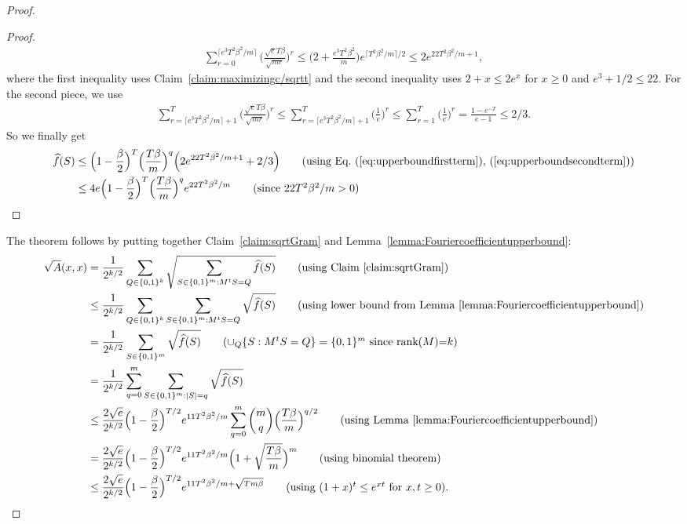 \documentclass[twoside,11pt]{article}
\def\01{\{0,1\}}
\begin{document}
\begin{proof}
\begin{proof}
		\begin{align}
		\label{eq:upperboundfirstterm}
		\sum_{r=0}^{\lceil e^3T^2\beta^2/m\rceil} \Big( \frac{\sqrt{e}T\beta}{\sqrt{mr}} \Big)^{r}\leq \Big(2+\frac{e^3T^2\beta^2}{m} \Big)e^{\lceil T^2\beta^2/m \rceil/2}\leq 2e^{22T^2\beta^2/m+1}, 
		\end{align}
		where the first inequality uses Claim~\ref{claim:maximizingc/sqrtt} and the second inequality uses $2+x\leq 2e^x$ for $x\geq 0$ and $e^3+1/2\leq 22$.
		For the second piece, we  use 
		\begin{align}
		\label{eq:upperboundsecondterm}
		\sum_{r={\lceil e^3T^2\beta^2/m\rceil+1}}^{T} \Big( \frac{\sqrt{e}T\beta}{\sqrt{mr}} \Big)^{r} \leq \sum_{r={\lceil e^3T^2\beta^2/m\rceil+1}}^{T}\Big( \frac{1}{e} \Big)^{r} \leq  \sum_{r=1}^{T} \Big( \frac{1}{e} \Big)^{r} = \frac{1-e^{-T}}{e-1} \leq 2/3. 
		\end{align}
		So we finally get
		\begin{align*}
		\widehat{f}(S)&\leq \Big(1-\frac{\beta}{2}\Big)^T \Big( \frac{T\beta}{m} \Big)^{q}\Big(2e^{22T^2\beta^2/m+1}+2/3\Big) \tag{using Eq.~(\ref{eq:upperboundfirstterm}), (\ref{eq:upperboundsecondterm})}\\
		&\leq 4e\Big(1-\frac{\beta}{2}\Big)^T \Big( \frac{T\beta}{m} \Big)^{q}e^{22T^2\beta^2/m} \tag{since $22T^2\beta^2/m>0$}
		\end{align*}
	\end{proof}
	The theorem follows by putting together Claim~\ref{claim:sqrtGram} and Lemma~\ref{lemma:Fouriercoefficientupperbound}:
	\begin{align*}
	\sqrt{A}(x,x)&=\frac{1}{2^{k/2}}\sum_{Q\in \01^{k}} \sqrt{ \sum_{S\in \01^m:M^t S =Q} \widehat{f} (S)}\tag{using Claim~\ref{claim:sqrtGram}}\\ 
	&\leq \frac{1}{2^{k/2}}\sum_{Q\in \01^{k}} \sum_{S\in \01^m:M^t S =Q} \sqrt{ \widehat{f} (S)} \tag{using lower bound from Lemma~\ref{lemma:Fouriercoefficientupperbound}}\\ 
	&= \frac{1}{2^{k/2}} \sum_{S\in \01^m} \sqrt{ \widehat{f} (S)} \tag{$\cup_Q\{S:M^t S=Q\}=\01^m$ since rank($M$)=$k$} \\
	&= \frac{1}{2^{k/2}} \sum_{q=0}^m\sum_{S\in \01^m:|S|=q} \sqrt{ \widehat{f} (S)} \\
	&\leq \frac{2\sqrt{e}}{2^{k/2}}\Big(1-\frac{\beta}{2}\Big)^{T/2} e^{11T^2\beta^2/m} \sum_{q=0}^m \binom{m}{q}  \Big( \frac{T\beta}{m} \Big)^{q/2} \tag{using Lemma~\ref{lemma:Fouriercoefficientupperbound}} \\
	&= \frac{2\sqrt{e}}{2^{k/2}}\Big(1-\frac{\beta}{2}\Big)^{T/2} e^{11T^2\beta^2/m}\Big(1+\sqrt{\frac{T\beta}{m} }\Big)^m  \tag{using binomial theorem}\\
	&\leq  \frac{2\sqrt{e}}{2^{k/2}}\Big(1-\frac{\beta}{2}\Big)^{T/2} e^{11T^2\beta^2/m+\sqrt{Tm\beta}} \tag{using $(1+x)^t\leq e^{xt}$ for~$x,t\geq 0$}.
	\end{align*}
\end{proof}
\end{document}
